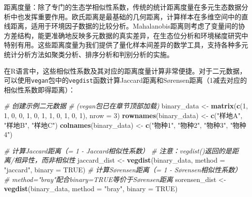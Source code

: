 \documentclass[
  twoside,12pt,fontset=none]{ctexbook}
\newenvironment{Shaded}{\begin{snugshade}}{\end{snugshade}}
\newcommand{\AttributeTok}[1]{\textcolor[rgb]{0.13,0.29,0.53}{#1}}
\newcommand{\CommentTok}[1]{\textcolor[rgb]{0.56,0.35,0.01}{\textit{#1}}}
\newcommand{\ConstantTok}[1]{\textcolor[rgb]{0.56,0.35,0.01}{#1}}
\newcommand{\DecValTok}[1]{\textcolor[rgb]{0.00,0.00,0.81}{#1}}
\newcommand{\FunctionTok}[1]{\textcolor[rgb]{0.13,0.29,0.53}{\textbf{#1}}}
\newcommand{\NormalTok}[1]{#1}
\newcommand{\OtherTok}[1]{\textcolor[rgb]{0.56,0.35,0.01}{#1}}
\newcommand{\StringTok}[1]{\textcolor[rgb]{0.31,0.60,0.02}{#1}}
\begin{document}
距离度量：除了专门的生态学相似性系数，传统的统计距离度量在多元生态数据分析中也发挥重要作用。欧氏距离是最基础的几何距离，计算样本在多维空间中的直线距离，适用于环境因子数据的比较分析。Mahalanobis距离则考虑了变量间的协方差结构，能更准确地反映多元数据的真实差异，在生态位分析和环境梯度研究中特别有用。这些距离度量为我们提供了量化样本间差异的数学工具，支持各种多元统计分析方法如聚类分析、排序分析和判别分析的实施。

在R语言中，这些相似性系数及其对应的距离度量计算非常便捷。对于二元数据，可以使用\texttt{vegan}包中的\texttt{vegdist}函数计算Jaccard距离和Sørensen距离（1减去对应的相似性系数即得距离）：

\begin{Shaded}
\begin{Highlighting}[]
\CommentTok{\# 创建示例二元数据}
\CommentTok{\# (vegan包已在章节顶部加载)}
\NormalTok{binary\_data }\OtherTok{\textless{}{-}} \FunctionTok{matrix}\NormalTok{(}\FunctionTok{c}\NormalTok{(}\DecValTok{1}\NormalTok{, }\DecValTok{1}\NormalTok{, }\DecValTok{0}\NormalTok{, }\DecValTok{0}\NormalTok{, }\DecValTok{1}\NormalTok{, }\DecValTok{0}\NormalTok{, }\DecValTok{1}\NormalTok{, }\DecValTok{1}\NormalTok{, }\DecValTok{0}\NormalTok{, }\DecValTok{1}\NormalTok{, }\DecValTok{0}\NormalTok{, }\DecValTok{1}\NormalTok{), }\AttributeTok{nrow =} \DecValTok{3}\NormalTok{)}
\FunctionTok{rownames}\NormalTok{(binary\_data) }\OtherTok{\textless{}{-}} \FunctionTok{c}\NormalTok{(}\StringTok{"样地A"}\NormalTok{, }\StringTok{"样地B"}\NormalTok{, }\StringTok{"样地C"}\NormalTok{)}
\FunctionTok{colnames}\NormalTok{(binary\_data) }\OtherTok{\textless{}{-}} \FunctionTok{c}\NormalTok{(}\StringTok{"物种1"}\NormalTok{, }\StringTok{"物种2"}\NormalTok{, }\StringTok{"物种3"}\NormalTok{, }\StringTok{"物种4"}\NormalTok{)}

\CommentTok{\# 计算Jaccard距离（= 1 {-} Jaccard相似性系数）}
\CommentTok{\# 注意：vegdist()返回的是距离/相异性，而非相似性}
\NormalTok{jaccard\_dist }\OtherTok{\textless{}{-}} \FunctionTok{vegdist}\NormalTok{(binary\_data, }\AttributeTok{method =} \StringTok{"jaccard"}\NormalTok{, }\AttributeTok{binary =} \ConstantTok{TRUE}\NormalTok{)}
\CommentTok{\# 计算Sørensen距离（= 1 {-} Sørensen相似性系数）}
\CommentTok{\# method="bray"配合binary=TRUE等价于Sørensen距离}
\NormalTok{sorensen\_dist }\OtherTok{\textless{}{-}} \FunctionTok{vegdist}\NormalTok{(binary\_data, }\AttributeTok{method =} \StringTok{"bray"}\NormalTok{, }\AttributeTok{binary =} \ConstantTok{TRUE}\NormalTok{)}
\end{Highlighting}
\end{Shaded}
\end{document}
